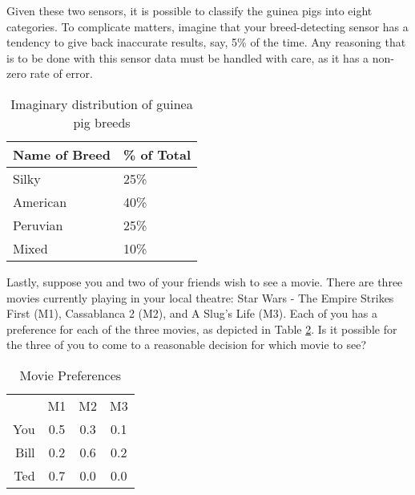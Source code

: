 \documentclass[thesis.tex]{subfiles}
\begin{document}
Given these two sensors, it is possible to classify the guinea pigs into eight categories.
To complicate matters, imagine that your breed-detecting sensor has a tendency to give back inaccurate
results, say, 5\% of the time. Any reasoning that is to be done with this sensor data must be
handled with care, as it has a non-zero rate of error.

\begin{table}
  \begin{center}
    \begin{tabular}{| l | l |}
      \hline
      Name of Breed & \% of Total \\
      \hline
      Silky         & 25\%        \\
      American      & 40\%        \\
      Peruvian      & 25\%        \\
      Mixed         & 10\%        \\
      \hline
    \end{tabular}
  \end{center}

  \caption{Imaginary distribution of guinea pig breeds}
  \label{tbl:guinea-pig-breeds}
\end{table}

Lastly, suppose you and two of your friends wish to see a movie. There are three movies currently
playing in your local theatre: Star Wars - The Empire Strikes First (M1), Cassablanca 2 (M2), and
A Slug's Life (M3). Each of you has a preference for each of the three movies, as depicted in
Table \ref{tbl:movies}. Is it possible for the three of you to come to a reasonable decision for
which movie to see?

\begin{table}
  \begin{center}
    \begin{tabular}{ r|c|c|c| }
      \multicolumn{1}{r}{}
      &  \multicolumn{1}{c}{M1}
      &  \multicolumn{1}{c}{M2}
      &  \multicolumn{1}{c}{M3} \\
      \cline{2-4}
      You & 0.5 & 0.3 & 0.1 \\
      \cline{2-4}
      Bill & 0.2 & 0.6 & 0.2 \\
      \cline{2-4}
      Ted  & 0.7 & 0.0 & 0.0 \\
      \cline{2-4}
    \end{tabular}
  \end{center}

  \caption{Movie Preferences}
  \label{tbl:movies}
\end{table}
\end{document}
